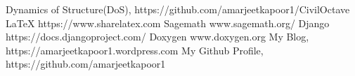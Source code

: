 \begin{thebibliography}{9}
\bibitem{} Dynamics of Structure(DoS), https://github.com/amarjeetkapoor1/CivilOctave
\bibitem{} \LaTeX{} https://www.sharelatex.com
\bibitem{} Sagemath www.sagemath.org/
\bibitem{} Django https://docs.djangoproject.com/
\bibitem{} Doxygen www.doxygen.org
\bibitem{} My Blog, https://amarjeetkapoor1.wordpress.com
\bibitem{} My Github Profile, https://github.com/amarjeetkapoor1
\end{thebibliography}
